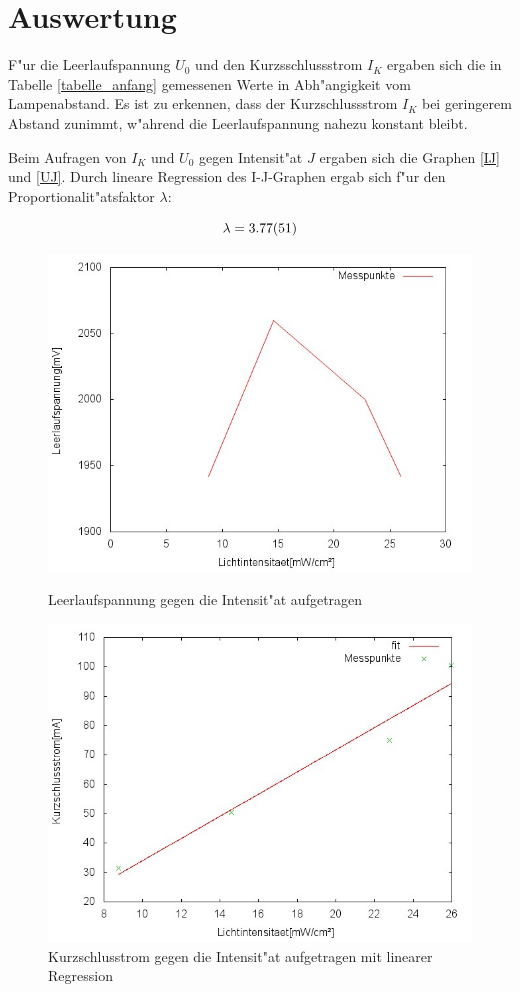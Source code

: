 \section{Auswertung}
	\label{sec:auswertung}

	F"ur die Leerlaufspannung $U_0$ und den Kurzsschlussstrom $I_K$ ergaben sich die in Tabelle \eqref{tabelle_anfang} gemessenen Werte in Abh"angigkeit vom Lampenabstand.
	Es ist zu erkennen, dass der Kurzschlussstrom $I_K$ bei geringerem Abstand zunimmt, w"ahrend die Leerlaufspannung nahezu konstant bleibt.

	

	Beim Aufragen von $I_K$ und $U_0$ gegen Intensit"at $J$ ergaben sich die Graphen \eqref{IJ} und \eqref{UJ}.
	Durch lineare Regression des I-J-Graphen ergab sich f"ur den Proportionalit"atsfaktor $\lambda$:

	\begin{equation*}
		\lambda = \SI{3.77 (51)}{}
	\end{equation*}

	\begin{figure}[htbp]
		\centering
		\includegraphics[width = 12cm]{img/UJ.jpg}
		\caption{Leerlaufspannung gegen die Intensit"at aufgetragen}
		\label{UJ}

		
		\centering
		\includegraphics[width = 12cm]{img/IJ.jpg}
		\caption{Kurzschlusstrom gegen die Intensit"at aufgetragen mit linearer Regression}
		\label{IJ}
	\end{figure}

